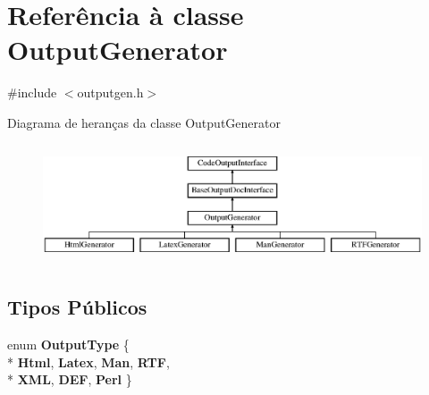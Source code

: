 \hypertarget{class_output_generator}{\section{Referência à classe Output\-Generator}
\label{class_output_generator}
}


{\ttfamily \#include $<$outputgen.\-h$>$}

Diagrama de heranças da classe Output\-Generator\begin{figure}[H]
\begin{center}
\leavevmode
\includegraphics[height=3.544304cm]{class_output_generator}
\end{center}
\end{figure}
\subsection*{Tipos Públicos}
\begin{DoxyCompactItemize}
\item 
enum {\bfseries Output\-Type} \{ \\*
{\bfseries Html}, 
{\bfseries Latex}, 
{\bfseries Man}, 
{\bfseries R\-T\-F}, 
\\*
{\bfseries X\-M\-L}, 
{\bfseries D\-E\-F}, 
{\bfseries Perl}
 \}
\end{DoxyCompactItemize}
